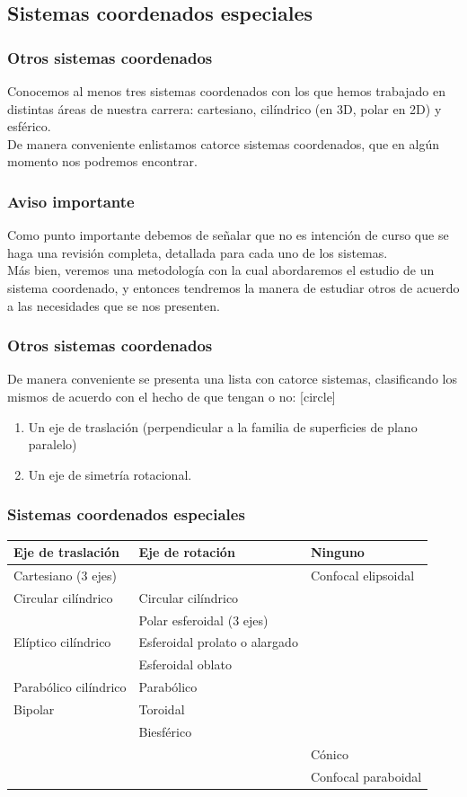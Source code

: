 \subsection{Sistemas coordenados especiales}
\begin{frame}
\frametitle{Otros sistemas coordenados}
Conocemos al menos tres sistemas coordenados con los que hemos trabajado en distintas áreas de nuestra carrera: cartesiano, cilíndrico (en 3D, polar en 2D) y esférico.
\\
\bigskip
\pause
De manera conveniente enlistamos catorce sistemas coordenados, que en algún momento nos podremos encontrar.
\end{frame}
\begin{frame}
\frametitle{Aviso importante}
Como punto importante debemos de señalar que no es intención de curso que se haga una revisión completa, detallada para cada uno de los sistemas.
\\
\bigskip
\pause
Más bien, veremos una metodología con la cual abordaremos el estudio de un sistema coordenado, y entonces tendremos la manera de estudiar otros de acuerdo a las necesidades que se nos presenten.
\end{frame}
\begin{frame}
\frametitle{Otros sistemas coordenados}
De manera conveniente se presenta una lista con catorce sistemas, clasificando los mismos de acuerdo con el hecho de que tengan o no:
[circle]
\begin{enumerate}
\item Un eje de traslación (perpendicular a la familia de superficies de plano paralelo)
\item Un eje de simetría rotacional.
\end{enumerate}
\end{frame}
\begin{frame}
\frametitle{Sistemas coordenados especiales}
\fontsize{8}{8}\selectfont
{
\renewcommand{\arraystretch}{1.2}
\begin{table}[H]
\centering
\begin{tabular}{p{3cm} p{4cm} p{2.5cm}}
Eje de traslación & Eje de rotación & Ninguno \\ \hline
Cartesiano ($3$ ejes) & & Confocal elipsoidal \\
Circular cilíndrico & Circular cilíndrico & \\
& Polar esferoidal ($3$ ejes) & \\
Elíptico cilíndrico & Esferoidal prolato o alargado & \\
& Esferoidal oblato & \\
Parabólico cilíndrico & Parabólico & \\
Bipolar & Toroidal & \\
& Biesférico & \\[0.5em]
& & Cónico \\
& & Confocal paraboidal \\
\end{tabular}
\end{table}
}
\end{frame}
